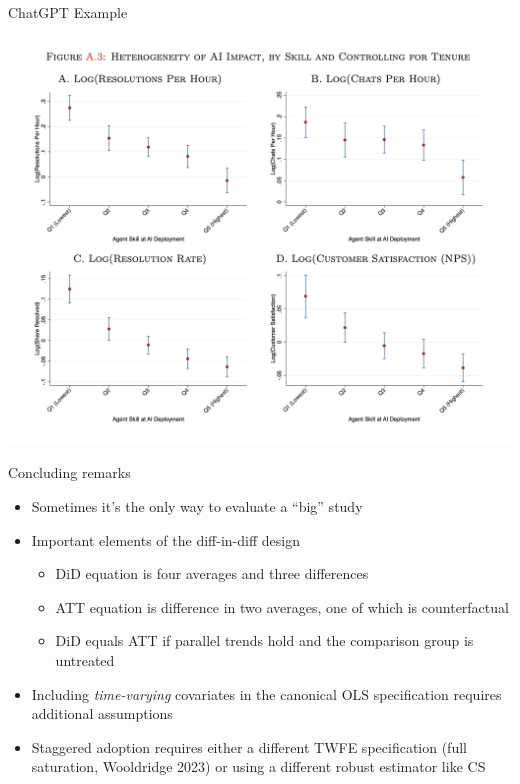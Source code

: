 \documentclass{beamer}
\begin{document}
\begin{frame}{ChatGPT Example}
             \includegraphics[scale=0.3]{./lecture_includes/chatgpt_skill}

\end{frame}

\begin{frame}{Concluding remarks}

\begin{itemize}
\item Sometimes it's the only way to evaluate a ``big'' study
\item Important elements of the diff-in-diff design
	\begin{itemize}
	\item DiD equation is four averages and three differences
	\item ATT equation is difference in two averages, one of which is counterfactual
	\item DiD equals ATT if parallel trends hold and the comparison group is untreated
	\end{itemize}
\item Including \emph{time-varying} covariates in the canonical OLS specification requires additional assumptions
\item Staggered adoption requires either a different TWFE specification (full saturation, Wooldridge 2023) or using a different robust estimator like CS
\end{itemize}

\end{frame}
\end{document}
